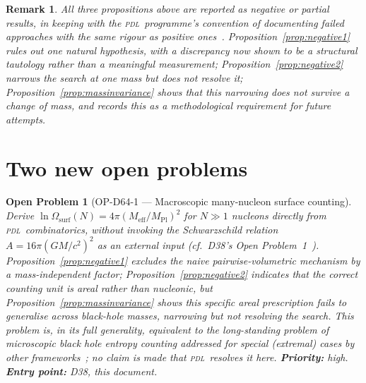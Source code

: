 \documentclass[12pt,a4paper]{article}
\newtheorem{remark}[theorem]{Remark}
\newtheorem{openproblem}{Open Problem}
\newcommand{\PDL}{\textsc{pdl}}
\newcommand{\Omegasurf}{\Omega_{\mathrm{surf}}}
\newcommand{\Meff}{M_{\mathrm{eff}}}
\newcommand{\MPl}{M_{\mathrm{Pl}}}
\begin{document}
\begin{remark}
All three propositions above are reported as negative or partial results, in keeping with the \PDL\ programme's convention of documenting failed approaches with the same rigour as positive ones~\cite{PDL_DM_v29}. Proposition~\ref{prop:negative1} rules out one natural hypothesis, with a discrepancy now shown to be a structural tautology rather than a meaningful measurement; Proposition~\ref{prop:negative2} narrows the search at one mass but does not resolve it; Proposition~\ref{prop:massinvariance} shows that this narrowing does not survive a change of mass, and records this as a methodological requirement for future attempts.
\end{remark}



\section{Two new open problems}
\label{sec:open}

\begin{openproblem}[OP-D64-1 --- Macroscopic many-nucleon surface counting]
\label{op:D64-1}
Derive $\ln\Omegasurf(N) = 4\pi(\Meff/\MPl)^2$ for $N\gg1$ nucleons directly from \PDL\ combinatorics, without invoking the Schwarzschild relation $A=16\pi(GM/c^2)^2$ as an external input (cf.\ D38's Open Problem~1~\cite{PDL_D38_2026}). Proposition~\ref{prop:negative1} excludes the naive pairwise-volumetric mechanism by a mass-independent factor; Proposition~\ref{prop:negative2} indicates that the correct counting unit is areal rather than nucleonic, but Proposition~\ref{prop:massinvariance} shows this specific areal prescription fails to generalise across black-hole masses, narrowing but not resolving the search. This problem is, in its full generality, equivalent to the long-standing problem of microscopic black hole entropy counting addressed for special (extremal) cases by other frameworks~\cite{StromingerVafa1996}; no claim is made that \PDL\ resolves it here. \textbf{Priority:} high. \textbf{Entry point:} D38, this document.
\end{openproblem}
\end{document}
